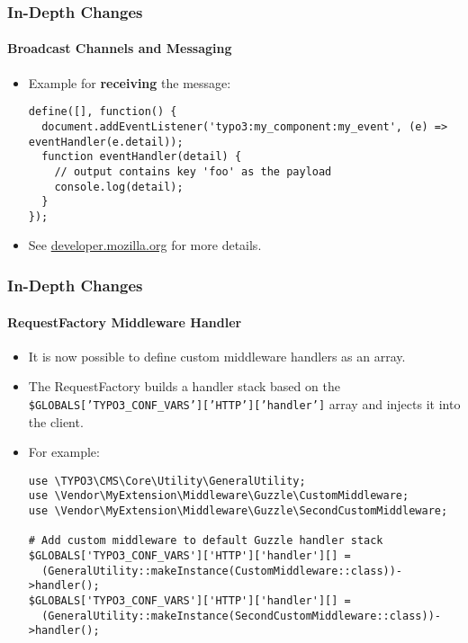 
\begin{frame}[fragile]
	\frametitle{In-Depth Changes}
	\framesubtitle{Broadcast Channels and Messaging}

	\lstset{basicstyle=\tiny\ttfamily}

	\begin{itemize}
		\item Example for \textbf{receiving} the message:
\begin{lstlisting}
define([], function() {
  document.addEventListener('typo3:my_component:my_event', (e) => eventHandler(e.detail));
  function eventHandler(detail) {
    // output contains key 'foo' as the payload
    console.log(detail);
  }
});
\end{lstlisting}

		\item See \href{https://developer.mozilla.org/en-US/docs/Web/API/Broadcast_Channel_API}{developer.mozilla.org} for more details.

	\end{itemize}

\end{frame}


\begin{frame}[fragile]
	\frametitle{In-Depth Changes}
	\framesubtitle{RequestFactory Middleware Handler}

	\lstset{basicstyle=\tiny\ttfamily}

	\begin{itemize}
		\item It is now possible to define custom middleware handlers as an array.
		\item The RequestFactory builds a handler stack based on the\newline
			\small
				\texttt{\$GLOBALS['TYPO3\_CONF\_VARS']['HTTP']['handler']}
			\normalsize
			array and injects it into the client.
		\item For example:
\begin{lstlisting}
use \TYPO3\CMS\Core\Utility\GeneralUtility;
use \Vendor\MyExtension\Middleware\Guzzle\CustomMiddleware;
use \Vendor\MyExtension\Middleware\Guzzle\SecondCustomMiddleware;

# Add custom middleware to default Guzzle handler stack
$GLOBALS['TYPO3_CONF_VARS']['HTTP']['handler'][] =
  (GeneralUtility::makeInstance(CustomMiddleware::class))->handler();
$GLOBALS['TYPO3_CONF_VARS']['HTTP']['handler'][] =
  (GeneralUtility::makeInstance(SecondCustomMiddleware::class))->handler();
\end{lstlisting}

	\end{itemize}

\end{frame}

